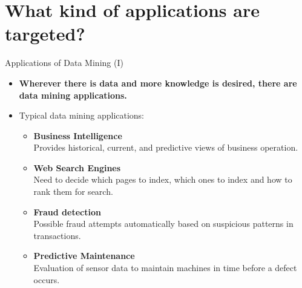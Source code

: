 \section{What kind of applications are targeted?}

\begin{frame}{Applications of Data Mining (I)}
	\begin{itemize}
		\item \textbf{Wherever there is data and more knowledge is desired,
			      there are data mining applications.}\\
		\item Typical data mining applications:
		      \begin{itemize}
			      \item \textbf{Business Intelligence} \\
			            \small{Provides historical, current, and predictive views of
				            business operation.}
			      \item \textbf{Web Search Engines} \\
			            \small{Need to decide which pages to index, which ones to
				            index and how to rank them for search.}
			      \item \textbf{Fraud detection} \\
			            \small{Possible fraud attempts automatically based on
				            suspicious patterns in transactions.}
			      \item \textbf{Predictive Maintenance} \\
			            \small{Evaluation of sensor data to maintain machines in time
				            before a defect occurs.}
		      \end{itemize}
	\end{itemize}
\end{frame}

